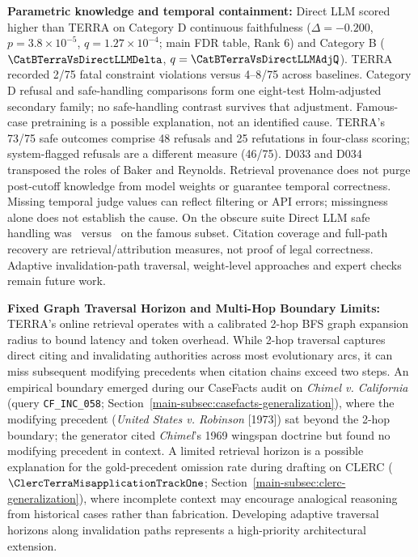 \item \textbf{Parametric knowledge and temporal containment:} Direct LLM scored higher than TERRA on Category D continuous faithfulness ($\Delta=-0.200$, $p=3.8\times10^{-5}$, $q=1.27\times10^{-4}$; main FDR table, Rank 6) and Category B ($\CatBTerraVsDirectLLMDelta$, $q=\CatBTerraVsDirectLLMAdjQ$). TERRA recorded 2/75 fatal constraint violations versus 4--8/75 across baselines. Category D refusal and safe-handling comparisons form one eight-test Holm-adjusted secondary family; no safe-handling contrast survives that adjustment. Famous-case pretraining is a possible explanation, not an identified cause. TERRA's 73/75 safe outcomes comprise 48 refusals and 25 refutations in four-class scoring; system-flagged refusals are a different measure (46/75). D033 and D034 transposed the roles of Baker and Reynolds. Retrieval provenance does not purge post-cutoff knowledge from model weights or guarantee temporal correctness. Missing temporal judge values can reflect filtering or API errors; missingness alone does not establish the cause. On the obscure suite Direct LLM safe handling was \ObscDirectSafePct\ versus \ObscCrossDirectFamousSafe\ on the famous subset. Citation coverage and full-path recovery are retrieval/attribution measures, not proof of legal correctness. Adaptive invalidation-path traversal, weight-level approaches and expert checks remain future work.

\item \textbf{Fixed Graph Traversal Horizon and Multi-Hop Boundary Limits:} TERRA's online retrieval operates with a calibrated 2-hop BFS graph expansion radius to bound latency and token overhead. While 2-hop traversal captures direct citing and invalidating authorities across most evolutionary arcs, it can miss subsequent modifying precedents when citation chains exceed two steps. An empirical boundary emerged during our CaseFacts audit on \textit{Chimel v. California} (query \texttt{CF\_\allowbreak{}INC\_\allowbreak{}058}; Section~\ref{main-subsec:casefacts-generalization}), where the modifying precedent (\textit{United States v. Robinson} [1973]) sat beyond the 2-hop boundary; the generator cited \textit{Chimel}'s 1969 wingspan doctrine but found no modifying precedent in context. A limited retrieval horizon is a possible explanation for the gold-precedent omission rate during drafting on CLERC ($\ClercTerraMisapplicationTrackOne$; Section~\ref{main-subsec:clerc-generalization}), where incomplete context may encourage analogical reasoning from historical cases rather than fabrication. Developing adaptive traversal horizons along invalidation paths represents a high-priority architectural extension.

